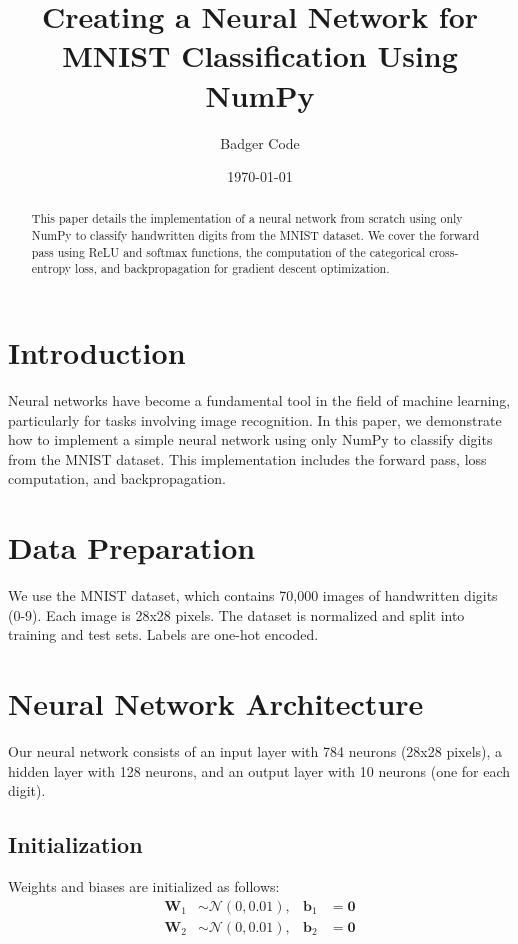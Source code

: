 \documentclass{article}
\title{Creating a Neural Network for MNIST Classification Using NumPy}
\author{Badger Code}
\date{\today}
\begin{document}
\maketitle

\begin{abstract}
This paper details the implementation of a neural network from scratch using only NumPy to classify handwritten digits from the MNIST dataset. We cover the forward pass using ReLU and softmax functions, the computation of the categorical cross-entropy loss, and backpropagation for gradient descent optimization.
\end{abstract}

\section{Introduction}
Neural networks have become a fundamental tool in the field of machine learning, particularly for tasks involving image recognition. In this paper, we demonstrate how to implement a simple neural network using only NumPy to classify digits from the MNIST dataset. This implementation includes the forward pass, loss computation, and backpropagation.

\section{Data Preparation}
We use the MNIST dataset, which contains 70,000 images of handwritten digits (0-9). Each image is 28x28 pixels. The dataset is normalized and split into training and test sets. Labels are one-hot encoded.

\section{Neural Network Architecture}
Our neural network consists of an input layer with 784 neurons (28x28 pixels), a hidden layer with 128 neurons, and an output layer with 10 neurons (one for each digit).

\subsection{Initialization}
Weights and biases are initialized as follows:
\begin{align}
\mathbf{W}_1 &\sim \mathcal{N}(0, 0.01), & \mathbf{b}_1 &= \mathbf{0} \\
\mathbf{W}_2 &\sim \mathcal{N}(0, 0.01), & \mathbf{b}_2 &= \mathbf{0}
\end{align}
\end{document}
